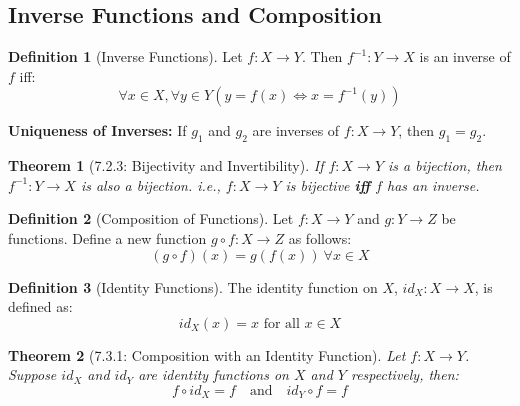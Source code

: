 \documentclass{article}
\theoremstyle{plain}
\newtheorem{theorem}{Theorem}[section]
\theoremstyle{definition}
\newtheorem*{definition}{Definition}
\theoremstyle{remark}
\begin{document}
\begin{center}
\end{center}
\vspace{1em}

\subsection{Inverse Functions and Composition}

\begin{definition}[Inverse Functions]
    Let $f: X \rightarrow Y$. Then $f^{-1}: Y \rightarrow X$ is an inverse of $f$ iff:
    \[ \forall x \in X, \forall y \in Y (y = f(x) \Leftrightarrow x = f^{-1}(y)) \]
\end{definition}

\textbf{Uniqueness of Inverses:} If $g_1$ and $g_2$ are inverses of $f: X \rightarrow Y$, then $g_1 = g_2$.

\begin{theorem}[7.2.3: Bijectivity and Invertibility]
    If $f: X \rightarrow Y$ is a bijection, then $f^{-1}: Y \rightarrow X$ is also a bijection.
    i.e., $f: X \rightarrow Y$ is bijective \textbf{iff} $f$ has an inverse.
\end{theorem}

\begin{definition}[Composition of Functions]
    Let $f: X \rightarrow Y$ and $g: Y \rightarrow Z$ be functions. Define a new function $g \circ f: X \rightarrow Z$ as follows:
    \[ (g \circ f)(x) = g(f(x)) \ \forall x \in X \]
\end{definition}

\begin{definition}[Identity Functions]
    The identity function on $X$, $id_X: X \rightarrow X$, is defined as:
    \[ id_X(x) = x \text{ for all } x \in X \]
\end{definition}

\begin{theorem}[7.3.1: Composition with an Identity Function]
    Let $f: X \rightarrow Y$. Suppose $id_X$ and $id_Y$ are identity functions on $X$ and $Y$ respectively, then:
    \[ f \circ id_X = f \quad \text{and} \quad id_Y \circ f = f \]
\end{theorem}
\end{document}
